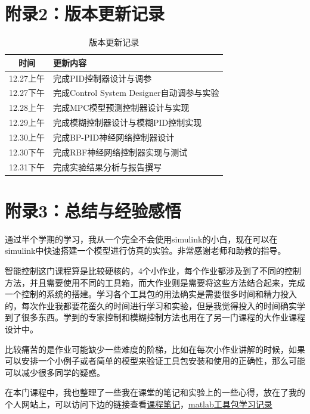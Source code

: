 \documentclass[12pt,a4paper,UTF8]{article}
\begin{document}
\newpage
\section{附录2：版本更新记录}


\begin{table}[htbp]
\centering
\caption{版本更新记录}
\begin{tabular}{|c|l|}
\hline
时间 & 更新内容 \\
\hline
12.27上午 & 完成PID控制器设计与调参 \\
\hline
12.27下午 & 完成Control System Designer自动调参与实验 \\
\hline
12.28上午 & 完成MPC模型预测控制器设计与实现 \\
\hline
12.29上午 & 完成模糊控制器设计与模糊PID控制实现 \\
\hline
12.30上午 & 完成BP-PID神经网络控制器设计 \\
\hline
12.30下午 & 完成RBF神经网络控制器实现与测试 \\
\hline
12.31下午 & 完成实验结果分析与报告撰写 \\
\hline
\end{tabular}
\end{table}


\clearpage
\section{附录3：总结与经验感悟}

通过半个学期的学习，我从一个完全不会使用simulink的小白，现在可以在simulink中快速搭建一个模型进行仿真的实验。非常感谢老师和助教的指导。

智能控制这门课程算是比较硬核的，4个小作业，每个作业都涉及到了不同的控制方法，并且需要使用不同的工具箱，而大作业则是需要将这些方法结合起来，完成一个控制的系统的搭建。学习各个工具包的用法确实是需要很多时间和精力投入的，每次作业我都要花蛮久的时间进行学习和实验，但是我觉得投入的时间确实学到了很多东西。学到的专家控制和模糊控制方法也用在了另一门课程的大作业课程设计中。

比较痛苦的是作业可能缺少一些难度的阶梯，比如在每次小作业讲解的时候，如果可以安排一个小例子或者简单的模型来验证工具包安装和使用的正确性，那么可能可以减少很多同学的疑惑。

在本门课程中，我也整理了一些我在课堂的笔记和实验上的一些心得，放在了我的个人网站上，可以访问下边的链接查看\href{https://www.philfan.cn/Robotics/Control/Control-11-%E6%99%BA%E8%83%BD%E6%8E%A7%E5%88%B6%E6%96%B9%E6%B3%95/}{课程笔记}，\href{https://www.philfan.cn/Tools/matlab/}{matlab工具包学习记录}
\end{document}
